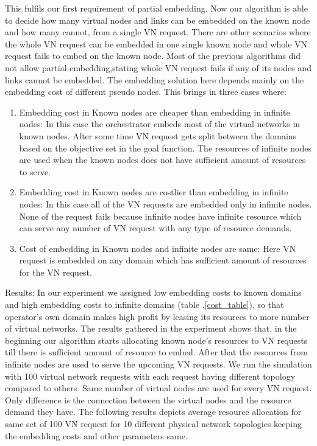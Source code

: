 \documentclass[article,dr=phil,type=msc ,colorback,accentcolor=tud4b]{tudthesis}
\begin{document}
This fulfils our first requirement of partial embedding. Now our algorithm is able to decide how many virtual nodes and links can be embedded on the known node and how many cannot, from a single VN request. There are other scenarios where the whole VN request can be embedded in one single known node and whole VN request fails to embed on the known node. Most of the previous algorithms did not allow partial embedding,stating whole VN request fails if any of its nodes and links cannot be embedded. The embedding solution here depends mainly on the embedding cost of different pseudo nodes. This brings in three cases where:
\begin{enumerate}
	\item Embedding cost in Known nodes are cheaper than embedding in infinite nodes: In this case the orchestrator embeds most of the virtual networks in known nodes. After some time VN request gets split between the domains based on the objective set in the goal function. The resources of infinite nodes are used when the known nodes does not have sufficient amount of resources to serve.
	
	\item  Embedding cost in Known nodes are costlier than embedding in infinite nodes: In this case all of the VN requests are embedded only in infinite nodes. None of the request fails because infinite nodes have infinite resource which can serve any number of VN request with any type of resource demands.
	
	\item Cost of embedding in Known nodes and infinite nodes are same: Here VN request is embedded on any domain which has sufficient amount of resources for the VN request. 
\end{enumerate}

Results: 
In our experiment we assigned low embedding costs to known domains and high embedding costs to infinite domains (table .\ref{cost_table}), so that operator's own domain makes high profit by leasing its resources to more number of virtual networks. The results gathered in the experiment shows that, in the beginning our algorithm starts allocating known node's resources to VN requests till there is sufficient amount of resource to embed. After that  
the resources from infinite nodes are used to serve the upcoming VN requests. We run the simulation with 100 virtual network requests with each request having different topology compared to others. Same number of virtual nodes are used for every VN request. Only difference is the connection between the virtual nodes and the resource demand they have. The following results depicts average resource allocation for same set of 100 VN request for 10 different physical network topologies keeping the embedding costs and other parameters same.
\end{document}
